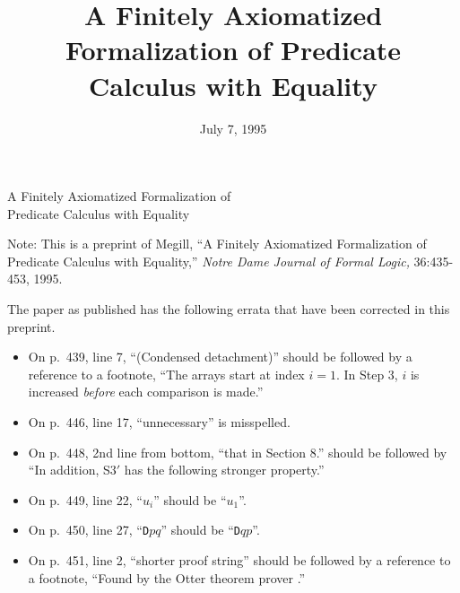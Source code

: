 \documentclass[leqno]{article}
\title{A Finitely Axiomatized Formalization of Predicate Calculus with
Equality}
\author{}
\date{July 7, 1995}
\begin{document}
%
%
%
%



\pagestyle{myheadings}
\begin{titlepage}

\vfill
\hfill

\begin{center}
{\LARGE A Finitely Axiomatized Formalization of\\ Predicate Calculus with
Equality}
\end{center}

\begin{center}
\vspace{10ex}
Note: This is a preprint of Megill,
``A Finitely Axiomatized Formalization of Predicate Calculus with Equality,''
{\em Notre Dame Journal of Formal Logic,} 36:435-453, 1995.
\end{center}

\vspace{10ex}

The paper as published has the following errata that have been
corrected in this preprint.
\begin{itemize}
\item On p.\ 439, line 7, ``(Condensed detachment)'' should be followed
by a reference to a footnote, ``The arrays
start at index $i=1$.  In Step 3, $i$ is increased {\em before}
each comparison is made.''

\item On p.\ 446, line 17, ``unnecessary'' is misspelled.

\item On p.\ 448, 2nd line from bottom, ``that in Section 8.'' should be
followed by ``In addition, S3\mbox{$'$} has the following stronger
property.''

\item On p.\ 449, line 22, ``$u_i$'' should be ``$u_1$''.

\item On p.\ 450, line 27, ``{\tt D}$pq$'' should be ``{\tt D}$qp$''.

\item On p.\ 451, line 2, ``shorter proof string'' should be followed
by a reference to a footnote, ``Found by the {\sc Otter} theorem
prover \cite{Wos}.''
\end{itemize}


\end{titlepage}
\end{document}
